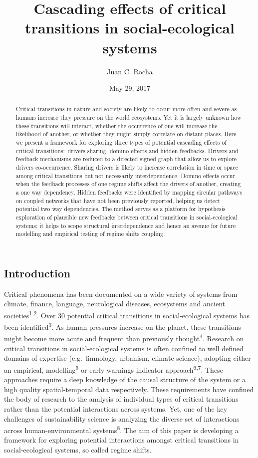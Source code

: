 \documentclass[9pt,]{article}
\title{Cascading effects of critical transitions in social-ecological systems}
\author{Juan C. Rocha}
\date{May 29, 2017}
\begin{document}
\maketitle
\begin{abstract}
Critical transitions in nature and society are likely to occur more
often and severe as humans increase they pressure on the world
ecosystems. Yet it is largely unknown how these transitions will
interact, whether the occurrence of one will increase the likelihood of
another, or whether they might simply correlate on distant places. Here
we present a framework for exploring three types of potential cascading
effects of critical transitions\(:\) drivers sharing, domino effects and
hidden feedbacks. Drivers and feedback mechanisms are reduced to a
directed signed graph that allow us to explore drivers co-occurrence.
Sharing drivers is likely to increase correlation in time or space among
critical transitions but not necessarily interdependence. Domino effects
occur when the feedback processes of one regime shifts affect the
drivers of another, creating a one way dependency. Hidden feedbacks were
identified by mapping circular pathways on coupled networks that have
not been previously reported, helping us detect potential two way
dependencies. The method serves as a platform for hypothesis exploration
of plausible new feedbacks between critical transitions in
social-ecological systems; it helps to scope structural interdependence
and hence an avenue for future modelling and empirical testing of regime
shifts coupling.
\end{abstract}

\subsection{Introduction}\label{introduction}

Critical phenomena has been documented on a wide variety of systems from
climate, finance, language, neurological diseases, ecosystems and
ancient societies\textsuperscript{1,2}. Over 30 potential critical
transitions in social-ecological systems has been
identified\textsuperscript{3}. As human pressures increase on the
planet, these transitions might become more acute and frequent than
previously thought\textsuperscript{4}. Research on critical transitions
in social-ecological systems is often confined to well defined domains
of expertise (e.g.~limnology, urbanism, climate science), adopting
either an empirical, modelling\textsuperscript{5} or early warnings
indicator approach\textsuperscript{6,7}. These approaches require a deep
knowledge of the causal structure of the system or a high quality
spatial-temporal data respectively. These requirements have confined the
body of research to the analysis of individual types of critical
transitions rather than the potential interactions across systems. Yet,
one of the key challenges of sustainability science is analyzing the
diverse set of interactions across human-environmental
systems\textsuperscript{8}. The aim of this paper is developing a
framework for exploring potential interactions amongst critical
transitions in social-ecological systems, so called regime shifts.
\end{document}
